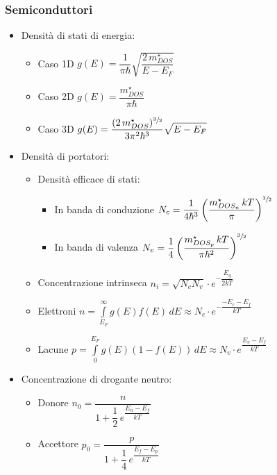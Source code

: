 \documentclass{article}
\begin{document}
\newpage

\subsubsection{Semiconduttori}
\begin{itemize}
  \item Densità di stati di energia:
        \begin{itemize}
          \item Caso 1D \( \displaystyle g(E) = \dfrac{1}{\pi \hbar} \sqrt{\dfrac{2 \, m_{DOS}^\star}{E-E_F}} \)
          \item Caso 2D \( g(E) = \dfrac{m_{DOS}^\star}{\pi \hbar} \)
          \item Caso 3D \( \displaystyle g(E) = \dfrac{(2 \, m_{DOS}^\star) ^ {\sfrac{3}{2}}}{3 \pi^2 \hbar^3} \sqrt{E-E_F} \)
        \end{itemize}
  \item Densità di portatori:
        \begin{itemize}
          \item Densità efficace di stati:
                \begin{itemize}
                  \item In banda di conduzione \( N_c = \dfrac{1}{4 \hbar ^ 3} \left(\dfrac{m^{\star}_{DOS_n} \, k T}{\pi} \right) ^ {\sfrac{3}{2}} \)
                  \item In banda di valenza \( N_v = \dfrac{1}{4} \left( \dfrac{ m^{\star}_{DOS_p} \, k T}{\pi \hbar ^ 2} \right) ^ {\sfrac{3}{2}} \)
                \end{itemize}
          \item Concentrazione intrinseca \( \displaystyle n_i = \sqrt{N_c  N_v} \cdot e ^ {-\dfrac{E_{g}}{2kT}} \)
          \item Elettroni \( \displaystyle n = \int\limits_{E_F}^{\infty} g(E) f(E) \, dE \approx N_c \cdot e ^ {-\dfrac{-E_c - E_f}{kT}} \)
          \item Lacune \( \displaystyle p = \int\limits_{0}^{E_F} g(E) \left( 1- f(E) \right) \, dE \approx N_v \cdot e ^ {\dfrac{E_v - E_f}{kT}} \)
        \end{itemize}
  \item Concentrazione di drogante neutro:
        \begin{itemize}
          \item Donore \( n_0 = \dfrac{n}{1 + \dfrac{1}{2} \, e^{\dfrac{E_n-E_f}{kT}}} \)
          \item Accettore \( p_0 = \dfrac{p}{1 + \dfrac{1}{4} \, e^{\dfrac{E_f-E_p}{kT}}} \)

\end{itemize}
\end{itemize}
\end{document}
